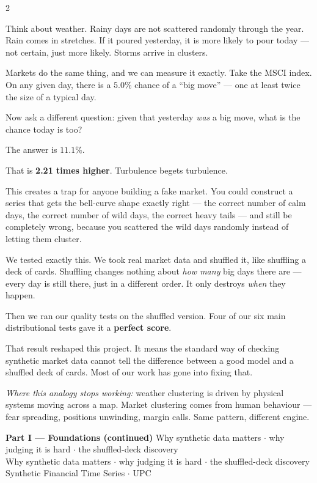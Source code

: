 \documentclass[10pt]{article}
\newcommand{\amberbox}[2]{\begin{tcolorbox}[mybox={Amber}{ABg},title={#1}]#2\end{tcolorbox}}
\newcommand{\pagehead}[2]{%
  \begin{tcolorbox}[enhanced,arc=0pt,outer arc=0pt,boxrule=0pt,
    colback=Navy,colframe=Navy,
    top=5pt,bottom=5pt,left=8pt,right=8pt,
    before skip=0pt,after skip=10pt]
  {\color{white}\large\bfseries #1}%
  \ifx\relax#2\relax\else\\[1pt]{\color{blue!30!white}\small #2}\fi
  \hfill{\color{blue!20!white}\footnotesize Synthetic Financial Time Series $\cdot$ UPC}
  \end{tcolorbox}}
\begin{document}
\begin{multicols}{2}
\columnbreak

\amberbox{4\quad Storms Cluster}{%
Think about weather. Rainy days are not scattered randomly through the year. Rain comes in stretches. If it poured yesterday, it is more likely to pour today --- not certain, just more likely. Storms arrive in clusters.

Markets do the same thing, and we can measure it exactly. Take the MSCI index. On any given day, there is a $5.0\%$ chance of a ``big move'' --- one at least twice the size of a typical day.

Now ask a different question: given that yesterday \emph{was} a big move, what is the chance today is too?

\medskip
The answer is $\mathbf{11.1\%}$.

\medskip
That is \textbf{2.21 times higher}. Turbulence begets turbulence.

This creates a trap for anyone building a fake market. You could construct a series that gets the bell-curve shape exactly right --- the correct number of calm days, the correct number of wild days, the correct heavy tails --- and still be completely wrong, because you scattered the wild days randomly instead of letting them cluster.

We tested exactly this. We took real market data and shuffled it, like shuffling a deck of cards. Shuffling changes nothing about \emph{how many} big days there are --- every day is still there, just in a different order. It only destroys \emph{when} they happen.

Then we ran our quality tests on the shuffled version. Four of our six main distributional tests gave it a \textbf{perfect score}.

That result reshaped this project. It means the standard way of checking synthetic market data cannot tell the difference between a good model and a shuffled deck of cards. Most of our work has gone into fixing that.

\smallskip
\textit{Where this analogy stops working:} weather clustering is driven by physical systems moving across a map. Market clustering comes from human behaviour --- fear spreading, positions unwinding, margin calls. Same pattern, different engine.}

\end{multicols}

\clearpage

\pagehead{Part I --- Foundations (continued)}
         {Why synthetic data matters $\cdot$ why judging it is hard $\cdot$ the shuffled-deck discovery}
\end{document}
